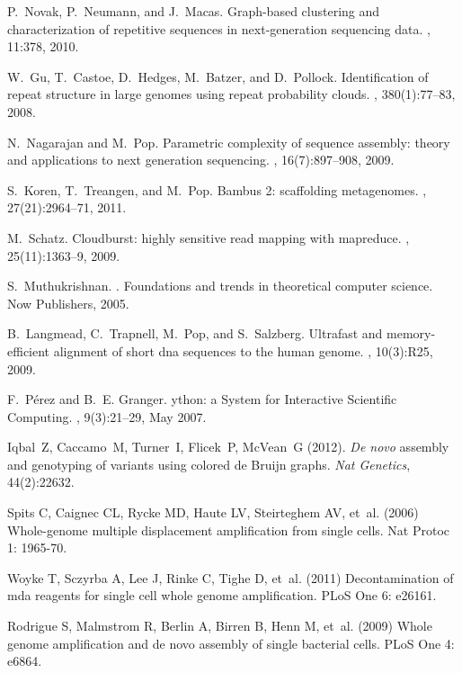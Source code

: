 \documentclass{pnastwo}
\begin{document}
\begin{article}
\begin{thebibliography}{20}
P.~Novak, P.~Neumann, and J.~Macas.
\newblock Graph-based clustering and characterization of repetitive sequences
  in next-generation sequencing data.
, 11:378, 2010.

W.~Gu, T.~Castoe, D.~Hedges, M.~Batzer, and D.~Pollock.
\newblock Identification of repeat structure in large genomes using repeat
  probability clouds.
, 380(1):77--83, 2008.

N.~Nagarajan and M.~Pop.
\newblock Parametric complexity of sequence assembly: theory and applications
  to next generation sequencing.
, 16(7):897--908, 2009.

S.~Koren, T.~Treangen, and M.~Pop.
\newblock Bambus 2: scaffolding metagenomes.
, 27(21):2964--71, 2011.

M.~Schatz.
\newblock Cloudburst: highly sensitive read mapping with mapreduce.
, 25(11):1363--9, 2009.

S.~Muthukrishnan.
.
\newblock Foundations and trends in theoretical computer science. Now
  Publishers, 2005.

B.~Langmead, C.~Trapnell, M.~Pop, and S.~Salzberg.
\newblock Ultrafast and memory-efficient alignment of short dna sequences to
  the human genome.
, 10(3):R25, 2009.

F.~P\'erez and B.~E. Granger.
ython: a {S}ystem for {I}nteractive {S}cientific {C}omputing.
, 9(3):21--29, May 2007.

 Iqbal~Z, Caccamo~M, Turner~I, Flicek~P, McVean~G (2012).  {\it De novo} assembly and genotyping of variants using
colored de Bruijn graphs.  {\it Nat Genetics}, 44(2):22632.

Spits C, Caignec CL, Rycke MD, Haute LV, Steirteghem AV, et~al. (2006)
  Whole-genome multiple displacement amplification from single cells.
\newblock Nat Protoc 1: 1965-70.

Woyke T, Sczyrba A, Lee J, Rinke C, Tighe D, et~al. (2011) Decontamination of
  mda reagents for single cell whole genome amplification.
\newblock PLoS One 6: e26161.

Rodrigue S, Malmstrom R, Berlin A, Birren B, Henn M, et~al. (2009) Whole genome
  amplification and de novo assembly of single bacterial cells.
\newblock PLoS One 4: e6864.

\end{thebibliography}

\end{article}
\end{document}
